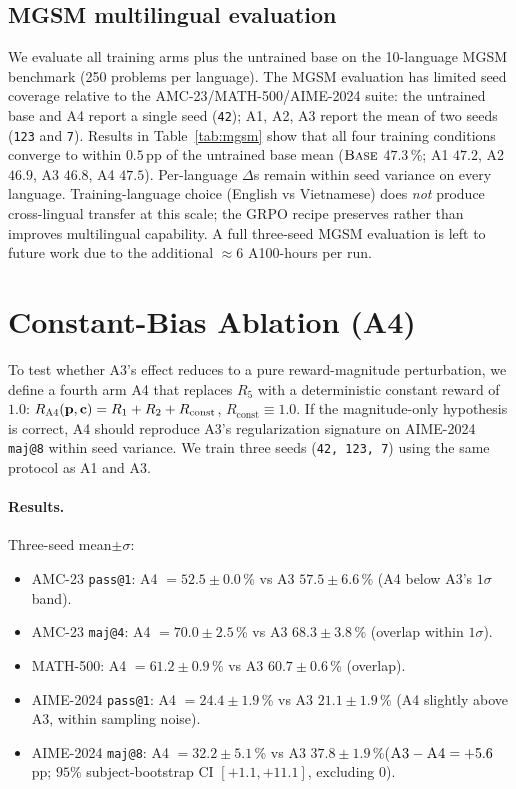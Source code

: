 \documentclass[11pt]{article}
\newcommand{\armA}{\textsc{A1}}
\newcommand{\armB}{\textsc{A2}}
\newcommand{\armC}{\textsc{A3}}
\newcommand{\armD}{\textsc{A4}}
\newcommand{\base}{\textsc{Base}}
\newcommand{\R}[1]{R_{#1}}
\begin{document}
\subsection{MGSM multilingual evaluation}
\label{sec:mgsm}
We evaluate all training arms plus the untrained base on the
10-language MGSM benchmark (250 problems per language). The MGSM
evaluation has limited seed coverage relative to the
AMC-23/MATH-500/AIME-2024 suite: the untrained base and \armD{} report
a single seed (\texttt{42}); \armA{}, \armB{}, \armC{} report the mean
of two seeds (\texttt{123} and \texttt{7}). Results in
Table~\ref{tab:mgsm} show that all four training conditions converge
to within $0.5$\,pp of the untrained base mean
($\base{}$ $47.3$\,\%; \armA{} $47.2$, \armB{} $46.9$, \armC{} $46.8$,
\armD{} $47.5$). Per-language $\Delta$s remain within seed variance on
every language. Training-language choice (English vs Vietnamese) does
\emph{not} produce cross-lingual transfer at this scale; the GRPO
recipe preserves rather than improves multilingual capability. A full
three-seed MGSM evaluation is left to future work due to the
additional $\approx 6$ A100-hours per run.



\section{Constant-Bias Ablation (\armD{})}
\label{sec:a4_ablation}

To test whether \armC{}'s effect reduces to a pure reward-magnitude
perturbation, we define a fourth arm \armD{} that replaces $\R{5}$ with
a deterministic constant reward of $1.0$:
$R_{\armD{}}(\mathbf{p},\mathbf{c}) = \R{1}+\R{2}+\R{\text{const}}$,
$\R{\text{const}}\equiv 1.0$. If the magnitude-only hypothesis is
correct, \armD{} should reproduce \armC{}'s regularization signature on
AIME-2024 \texttt{maj@8} within seed variance. We train three seeds
(\texttt{42, 123, 7}) using the same protocol as \armA{} and \armC{}.

\paragraph{Results.} Three-seed mean$\pm\sigma$:
\begin{itemize}\itemsep0pt
\item AMC-23 \texttt{pass@1}: \armD{} $=52.5\pm 0.0$\,\% vs \armC{}
$57.5\pm 6.6$\,\% (\armD{} below \armC{}'s $1\sigma$ band).
\item AMC-23 \texttt{maj@4}: \armD{} $=70.0\pm 2.5$\,\% vs \armC{}
$68.3\pm 3.8$\,\% (overlap within $1\sigma$).
\item MATH-500: \armD{} $=61.2\pm 0.9$\,\% vs \armC{} $60.7\pm 0.6$\,\%
(overlap).
\item AIME-2024 \texttt{pass@1}: \armD{} $=24.4\pm 1.9$\,\% vs \armC{}
$21.1\pm 1.9$\,\% (\armD{} slightly above \armC{}, within sampling
noise).
\item AIME-2024 \texttt{maj@8}: \armD{} $=32.2\pm 5.1$\,\% vs \armC{}
$37.8\pm 1.9$\,\%($\armC{}-\armD{}=+5.6$\,pp; $95\%$ subject-bootstrap CI
$[+1.1, +11.1]$, excluding $0$).
\end{itemize}
\end{document}
